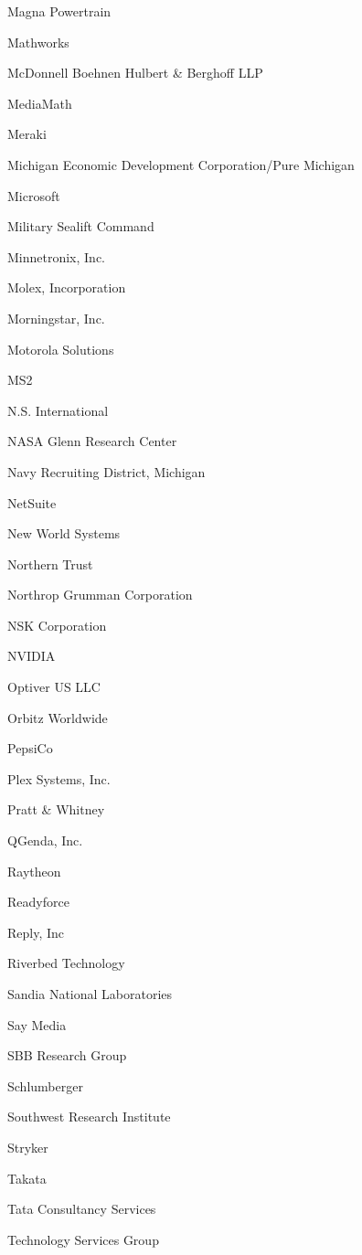 \documentclass[twoside]{article}
\begin{document}
\begin{center}
\begin{multicols}{5}
\begin{FlushLeft}
\begin{compactitem}
\item Magna Powertrain
\item Mathworks
\item McDonnell Boehnen Hulbert \& Berghoff LLP
\item MediaMath
\item Meraki
\item Michigan Economic Development Corporation/Pure Michigan
\item Microsoft
\item Military Sealift Command
\item Minnetronix, Inc.
\item Molex, Incorporation
\item Morningstar, Inc.
\item Motorola Solutions
\item MS2
\item N.S. International
\item NASA Glenn Research Center
\item Navy Recruiting District, Michigan
\item NetSuite
\item New World Systems
\item Northern Trust
\item Northrop Grumman Corporation
\item NSK Corporation
\item NVIDIA
\item Optiver US LLC
\item Orbitz Worldwide
\item PepsiCo
\item Plex Systems, Inc.
\item Pratt \& Whitney
\item QGenda, Inc.
\item Raytheon
\item Readyforce
\item Reply, Inc
\item Riverbed Technology
\item Sandia National Laboratories
\item Say Media
\item SBB Research Group
\item Schlumberger
\item Southwest Research Institute
\item Stryker
\item Takata
\item Tata Consultancy Services
\item Technology Services Group

\end{compactitem}
\end{FlushLeft}
\end{multicols}
\end{center}
\end{document}
